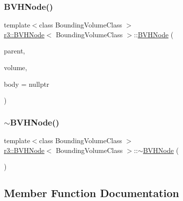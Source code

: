 \subsubsection{\texorpdfstring{B\+V\+H\+Node()}{BVHNode()}\hspace{0.1cm}{\footnotesize\ttfamily [2/2]}}
{\footnotesize\ttfamily template$<$class Bounding\+Volume\+Class $>$ \\
\mbox{\hyperlink{classr3_1_1_b_v_h_node}{r3\+::\+B\+V\+H\+Node}}$<$ Bounding\+Volume\+Class $>$\+::\mbox{\hyperlink{classr3_1_1_b_v_h_node}{B\+V\+H\+Node}} (\begin{DoxyParamCaption}\item[{\mbox{\hyperlink{classr3_1_1_b_v_h_node}{B\+V\+H\+Node}}$<$ Bounding\+Volume\+Class $>$ $\ast$}]{parent,  }\item[{const Bounding\+Volume\+Class \&}]{volume,  }\item[{\mbox{\hyperlink{classr3_1_1_rigid_body}{Rigid\+Body}} $\ast$}]{body = {\ttfamily nullptr} }\end{DoxyParamCaption})}

\mbox{\label{classr3_1_1_b_v_h_node_a72194bd522058bfd362b0ab77c0303af}} 
\subsubsection{\texorpdfstring{$\sim$\+B\+V\+H\+Node()}{~BVHNode()}}
{\footnotesize\ttfamily template$<$class Bounding\+Volume\+Class $>$ \\
\mbox{\hyperlink{classr3_1_1_b_v_h_node}{r3\+::\+B\+V\+H\+Node}}$<$ Bounding\+Volume\+Class $>$\+::$\sim$\mbox{\hyperlink{classr3_1_1_b_v_h_node}{B\+V\+H\+Node}} (\begin{DoxyParamCaption}{ }\end{DoxyParamCaption})}



\subsection{Member Function Documentation}
\mbox{\label{classr3_1_1_b_v_h_node_a9a8083e409cd4452e25878e80283440f}} 
